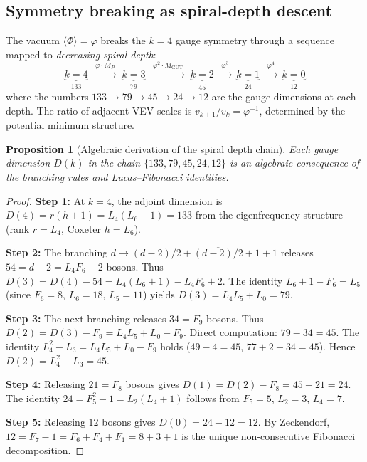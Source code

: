\documentclass[12pt,a4paper]{article}
\newtheorem{proposition}[theorem]{Proposition}
\begin{document}
\subsection{Symmetry breaking as spiral-depth descent}

The vacuum $\langle\Phi\rangle = \varphi$ breaks the $k = 4$ gauge symmetry through a sequence mapped to \emph{decreasing spiral depth}:
\begin{equation}
\underbrace{k{=}4}_{133} \;\xrightarrow{\;\varphi\cdot M_P\;}\;
\underbrace{k{=}3}_{79} \;\xrightarrow{\;\varphi^2\cdot M_{\mathrm{GUT}}\;}\;
\underbrace{k{=}2}_{45} \;\xrightarrow{\;\varphi^3\;}\;
\underbrace{k{=}1}_{24} \;\xrightarrow{\;\varphi^4\;}\;
\underbrace{k{=}0}_{12}
\label{eq:breaking}
\end{equation}
where the numbers $133 \to 79 \to 45 \to 24 \to 12$ are the gauge dimensions at each depth. The ratio of adjacent VEV scales is $v_{k+1}/v_k = \varphi^{-1}$, determined by the potential minimum structure.

\begin{proposition}[Algebraic derivation of the spiral depth chain]
\label{prop:depth-chain}
Each gauge dimension $D(k)$ in the chain $\{133, 79, 45, 24, 12\}$ is an algebraic consequence of the branching rules and Lucas--Fibonacci identities.
\end{proposition}
\begin{proof}
\textbf{Step 1:} At $k = 4$, the adjoint dimension is $D(4) = r(h{+}1) = L_4(L_6{+}1) = 133$ from the eigenfrequency structure (rank $r = L_4$, Coxeter $h = L_6$).

\textbf{Step 2:} The branching $d \to (d{-}2)/2 + \overline{(d{-}2)/2} + 1 + 1$ releases $54 = d {-} 2 = L_4 F_6 {-} 2$ bosons. Thus $D(3) = D(4) {-} 54 = L_4(L_6{+}1) {-} L_4 F_6 {+} 2$. The identity $L_6 {+} 1 {-} F_6 = L_5$ (since $F_6 = 8$, $L_6 = 18$, $L_5 = 11$) yields $D(3) = L_4 L_5 {+} L_0 = 79$.

\textbf{Step 3:} The next branching releases $34 = F_9$ bosons. Thus $D(2) = D(3) {-} F_9 = L_4 L_5 {+} L_0 {-} F_9$. Direct computation: $79 {-} 34 = 45$. The identity $L_4^2 {-} L_3 = L_4 L_5 {+} L_0 {-} F_9$ holds ($49 {-} 4 = 45$, $77 {+} 2 {-} 34 = 45$). Hence $D(2) = L_4^2 {-} L_3 = 45$.

\textbf{Step 4:} Releasing $21 = F_8$ bosons gives $D(1) = D(2) {-} F_8 = 45 {-} 21 = 24$. The identity $24 = F_5^2 {-} 1 = L_2(L_4{+}1)$ follows from $F_5 = 5$, $L_2 = 3$, $L_4 = 7$.

\textbf{Step 5:} Releasing $12$ bosons gives $D(0) = 24 {-} 12 = 12$. By Zeckendorf, $12 = F_7 {-} 1 = F_6 {+} F_4 {+} F_1 = 8 {+} 3 {+} 1$ is the unique non-consecutive Fibonacci decomposition.
\end{proof}
\end{document}
